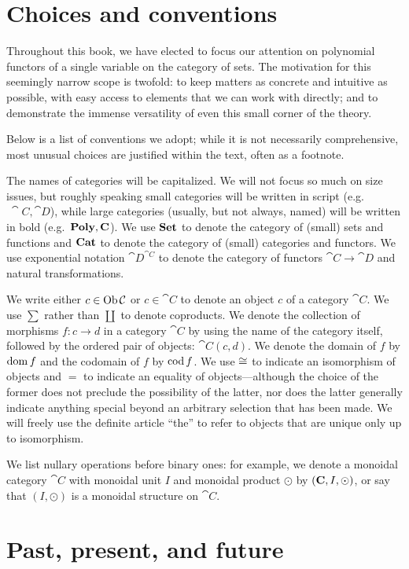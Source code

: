 \documentclass[Book-Poly]{subfiles}
\begin{document}
\section*{Choices and conventions}

Throughout this book, we have elected to focus our attention on polynomial functors of a single variable on the category of sets.
The motivation for this seemingly narrow scope is twofold: to keep matters as concrete and intuitive as possible, with easy access to elements that we can work with directly; and to demonstrate the immense versatility of even this small corner of the theory.

Below is a list of conventions we adopt; while it is not necessarily comprehensive, most unusual choices are justified within the text, often as a footnote.

The names of categories will be capitalized.
We will not focus so much on size issues, but roughly speaking small categories will be written in script (e.g.$\ \cat{C}, \cat{D}$), while large categories (usually, but not always, named) will be written in bold (e.g.\ $\mathbf{Poly}, \mathbf{C}$).
We use $\mathbf{Set}$ to denote the category of (small) sets and functions and $\mathbf{Cat}$ to denote the category of (small) categories and functors.
We use exponential notation $\cat{D}^{\cat{C}}$ to denote the category of functors $\cat{C}\to\cat{D}$ and natural transformations.

We write either $c\in\operatorname{Ob}\mathcal{C}$ or $c\in\cat{C}$ to denote an object $c$ of a category $\cat{C}$.
We use $\sum$ rather than $\coprod$ to denote coproducts.
We denote the collection of morphisms $f\colon c\to d$ in a category $\cat{C}$ by using the name of the category itself, followed by the ordered pair of objects: $\cat{C}(c,d)$.
We denote the domain of $f$ by $\operatorname{dom} f$ and the codomain of $f$ by $\operatorname{cod} f$.
We use $\cong$ to indicate an isomorphism of objects and $=$ to indicate an equality of objects---although the choice of the former does not preclude the possibility of the latter, nor does the latter generally indicate anything special beyond an arbitrary selection that has been made.
We will freely use the definite article ``the'' to refer to objects that are unique only up to isomorphism.

We list nullary operations before binary ones: for example, we denote a monoidal category $\cat{C}$ with monoidal unit $I$ and monoidal product $\odot$ by $(\mathbf{C},I,\odot)$, or say that $(I,\odot)$ is a monoidal structure on $\cat{C}$.

\section*{Past, present, and future}
\end{document}
